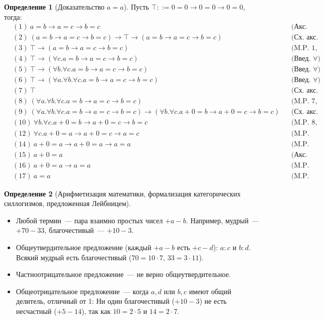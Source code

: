 \documentclass[a4paper,11pt]{article}
\theoremstyle{definition}
\newtheorem*{dfn}{Определение}
\begin{document}
\begin{dfn}[Доказательство $a = a$]
Пусть $\top ::= 0 = 0 \to 0 = 0 \to 0 = 0$, тогда:
\begin{align*}
&(1)\ a = b \to a = c \to b = c &&\text{(Акс.\ А1)}\\
&(2)\ (a = b \to a = c \to b = c) \to \top \to (a = b \to a = c \to b = c) &&\text{(Сх. акс. 1)}\\
&(3)\ \top \to (a = b \to a = c \to b = c) &&\text{(M.P. 1, 2)}\\
&(4)\ \top \to (\forall c.a = b \to a = c \to b = c) &&\text{(Введ. $\forall$)}\\
&(5)\ \top \to (\forall b.\forall c.a = b \to a = c \to b = c) &&\text{(Введ. $\forall$)}\\
&(6)\ \top \to (\forall a.\forall b.\forall c.a = b \to a = c \to b = c) &&\text{(Введ. $\forall$)}\\
&(7)\ \top &&\text{(Сх. акс. 1)}\\
&(8)\ (\forall a.\forall b.\forall c.a = b \to a = c \to b = c) &&\text{(M.P. 7, 6)}\\
&(9)\ (\forall a.\forall b.\forall c.a = b \to a = c \to b = c) \to (\forall b.\forall c.a + 0 = b \to a + 0 = c \to b = c) &&\text{(Сх. акс. 11)}\\
&(10)\ \forall b.\forall c.a + 0 = b \to a + 0 = c \to b = c &&\text{(M.P. 8, 9)}\\
&(12)\ \forall c.a + 0 = a \to a + 0 = c \to a = c &&\text{(M.P. 10, 11)}\\
&(14)\ a + 0 = a \to a + 0 = a \to a = a &&\text{(M.P. 12, 13)}\\
&(15)\ a + 0 = a &&\text{(Акс. А5)}\\
&(16)\ a + 0 = a \to a = a &&\text{(M.P. 15, 14)}\\
&(17)\ a = a &&\text{(M.P. 15, 16)}
\end{align*}
\end{dfn}
\begin{dfn}[Арифметизация математики, формализация категорических силлогизмов, предложенная Лейбницем]
\begin{itemize}
\item Любой термин~--- пара взаимно простых чисел $+a - b$. Например, мудрый~---
  $+70 - 33$, благочестивый~--- $+10 - 3$.
\item Общеутвердительное предложение (каждый $+a - b$ есть $+c - d$): $a : c$ и
  $b : d$. Всякий мудрый есть благочестивый ($70 = 10 \cdot 7$, $33 = 3 \cdot
  11$).
\item Частноотрицательное предложение~--- не верно общеутвердительное.
\item Общеотрицательное предложение~--- когда $a, d$ или $b, c$ имеют общий
  делитель, отличный от 1: Ни один благочестивый ($+10 - 3$) не есть несчастный
  ($+5 - 14$), так как $10 = 2 \cdot 5$ и $14 = 2 \cdot 7$.
\end{itemize}
\end{dfn}
\end{document}
